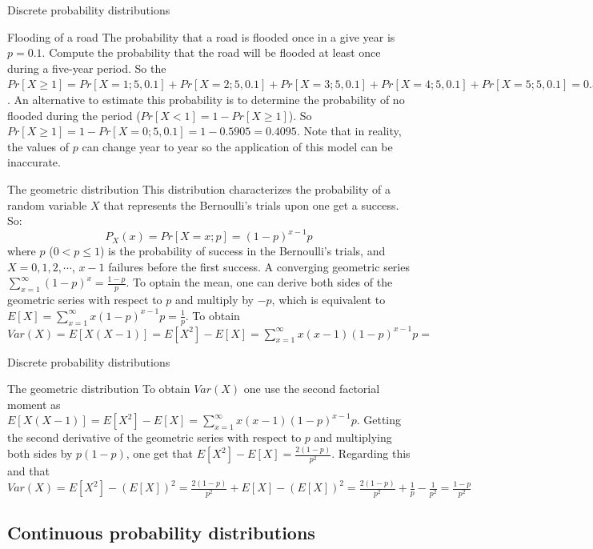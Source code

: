 \documentclass[8pt]{beamer}
\renewcommand{\emph}[1]{\textcolor{myorange}{#1}}
\begin{document}
\begin{frame}{Discrete probability distributions}
\begin{exampleblock}{Flooding of a road} %
        The probability that a road is flooded once in a give year is $p=0.1$. Compute the probability that the road will be flooded at least once during a five-year period. So the $Pr[X \geq 1] = Pr[X = 1;5,0.1] + Pr[X=2;5,0.1] + Pr[X=3;5,0.1]+ Pr[X=4;5,0.1] + Pr[X=5;5,0.1] = 0.3281 + 0.0729 + 0.0081 + 0.0005 + 0.00001 = 0.4095$. An alternative to  estimate this probability is to determine the probability of no flooded during the period ($Pr[X < 1]= 1-Pr[X \geq 1]$). So $Pr[X \geq 1] = 1-Pr[X=0;5,0.1] = 1-0.5905 = 0.4095$. Note that in reality, the values of $p$ can change year to year so the application of this model can be inaccurate. 
    \end{exampleblock}

    \begin{block}{The \alert{geometric} distribution}
        This distribution characterizes the probability of a random variable $X$ that represents the Bernoulli's trials upon one get a success. So:
        \[
            P_X (x) = Pr[X = x; p] = (1-p)^{x-1} p
        \]
        where $p$ ($0 < p \leq 1$) is the probability of success in the Bernoulli's trials, and $X = 0,1,2, \cdots$, $x-1$ failures before the first success. A converging \emph{geometric series} $\sum_{x=1}^{\infty} (1-p)^x = \frac{1-p}{p}$. To optain the mean, one can derive both sides of the geometric series with respect to $p$ and multiply by $-p$, which is equivalent to $E[X] = \sum_{x=1}^\infty x (1-p)^{x-1} p = \frac{1}{p}$. To obtain $Var (X) = E[X(X-1)] = E[X^2] - E[X] = \sum_{x=1}^\infty x(x-1) (1-p)^{x-1} p = 
$
    \end{block}
\end{frame}

\begin{frame}{Discrete probability distributions}
    \begin{block}{The \alert{geometric} distribution}
        To obtain $Var (X)$ one use the second factorial moment as $E[X(X-1)] = E[X^2] - E[X] = \sum_{x=1}^\infty x(x-1) (1-p)^{x-1} p$. Getting the second derivative of the \emph{geometric series} with respect to $p$ and multiplying both sides by $p(1-p)$, one get that $E[X^2] - E[X] = \frac{2(1-p)}{p^2}$. Regarding this and that $Var (X) = E[X^2] - \left(E[X]\right)^2 = \frac{2(1-p)}{p^2}+ E[X]-\left(E[X]\right)^2 = \frac{2(1-p)}{p^2} + \frac{1}{p}- \frac{1}{p^2} = \frac{1-p}{p^2}$ 
    \end{block}
\end{frame}



\subsection{Continuous probability distributions} %
\end{document}
